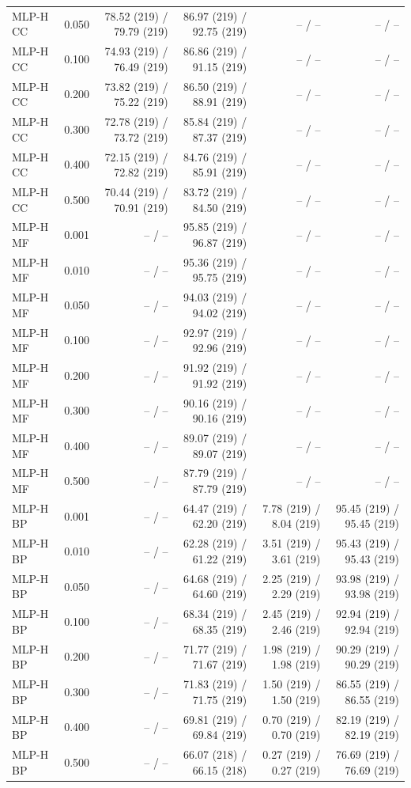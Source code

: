 \begin{longtable}{lrrrrr}
MLP-H CC & 0.050 & 78.52 (219) / 79.79 (219) & 86.97 (219) / 92.75 (219) & -- / -- & -- / -- \\
MLP-H CC & 0.100 & 74.93 (219) / 76.49 (219) & 86.86 (219) / 91.15 (219) & -- / -- & -- / -- \\
MLP-H CC & 0.200 & 73.82 (219) / 75.22 (219) & 86.50 (219) / 88.91 (219) & -- / -- & -- / -- \\
MLP-H CC & 0.300 & 72.78 (219) / 73.72 (219) & 85.84 (219) / 87.37 (219) & -- / -- & -- / -- \\
MLP-H CC & 0.400 & 72.15 (219) / 72.82 (219) & 84.76 (219) / 85.91 (219) & -- / -- & -- / -- \\
MLP-H CC & 0.500 & 70.44 (219) / 70.91 (219) & 83.72 (219) / 84.50 (219) & -- / -- & -- / -- \\
MLP-H MF & 0.001 & -- / -- & 95.85 (219) / 96.87 (219) & -- / -- & -- / -- \\
MLP-H MF & 0.010 & -- / -- & 95.36 (219) / 95.75 (219) & -- / -- & -- / -- \\
MLP-H MF & 0.050 & -- / -- & 94.03 (219) / 94.02 (219) & -- / -- & -- / -- \\
MLP-H MF & 0.100 & -- / -- & 92.97 (219) / 92.96 (219) & -- / -- & -- / -- \\
MLP-H MF & 0.200 & -- / -- & 91.92 (219) / 91.92 (219) & -- / -- & -- / -- \\
MLP-H MF & 0.300 & -- / -- & 90.16 (219) / 90.16 (219) & -- / -- & -- / -- \\
MLP-H MF & 0.400 & -- / -- & 89.07 (219) / 89.07 (219) & -- / -- & -- / -- \\
MLP-H MF & 0.500 & -- / -- & 87.79 (219) / 87.79 (219) & -- / -- & -- / -- \\
MLP-H BP & 0.001 & -- / -- & 64.47 (219) / 62.20 (219) & 7.78 (219) / 8.04 (219) & 95.45 (219) / 95.45 (219) \\
MLP-H BP & 0.010 & -- / -- & 62.28 (219) / 61.22 (219) & 3.51 (219) / 3.61 (219) & 95.43 (219) / 95.43 (219) \\
MLP-H BP & 0.050 & -- / -- & 64.68 (219) / 64.60 (219) & 2.25 (219) / 2.29 (219) & 93.98 (219) / 93.98 (219) \\
MLP-H BP & 0.100 & -- / -- & 68.34 (219) / 68.35 (219) & 2.45 (219) / 2.46 (219) & 92.94 (219) / 92.94 (219) \\
MLP-H BP & 0.200 & -- / -- & 71.77 (219) / 71.67 (219) & 1.98 (219) / 1.98 (219) & 90.29 (219) / 90.29 (219) \\
MLP-H BP & 0.300 & -- / -- & 71.83 (219) / 71.75 (219) & 1.50 (219) / 1.50 (219) & 86.55 (219) / 86.55 (219) \\
MLP-H BP & 0.400 & -- / -- & 69.81 (219) / 69.84 (219) & 0.70 (219) / 0.70 (219) & 82.19 (219) / 82.19 (219) \\
MLP-H BP & 0.500 & -- / -- & 66.07 (218) / 66.15 (218) & 0.27 (219) / 0.27 (219) & 76.69 (219) / 76.69 (219) \\
\bottomrule
\end{longtable}
\endgroup
